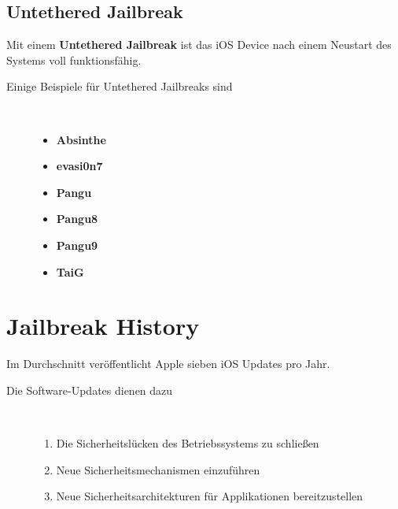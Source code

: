 \subsection{Untethered Jailbreak}
\label{sec:JBUntethered}
Mit einem \textbf{Untethered Jailbreak} ist das iOS Device nach einem Neustart des Systems voll funktionsfähig.
\begin{description}
\item[Einige Beispiele für Untethered Jailbreaks sind]~\par
	\begin{multicols}{2}
	\begin{itemize}
        \item \textbf{Absinthe}
        \item \textbf{evasi0n7}
        \item \textbf{Pangu}
        \item \textbf{Pangu8}
        \item \textbf{Pangu9}
        \item \textbf{TaiG}
    \end{itemize}
    \end{multicols}
\end{description} 


\section{Jailbreak History}
\label{sec:JBHistory}

Im Durchschnitt veröffentlicht Apple sieben iOS Updates pro Jahr. 
\begin{description}
\item[Die Software-Updates dienen dazu]~\par
	\begin{enumerate}
	    \item Die Sicherheitslücken des Betriebssystems zu schließen
	    \item Neue Sicherheitsmechanismen einzuführen
	    \item Neue Sicherheitsarchitekturen für Applikationen bereitzustellen
	\end{enumerate}
\end{description} 
 
